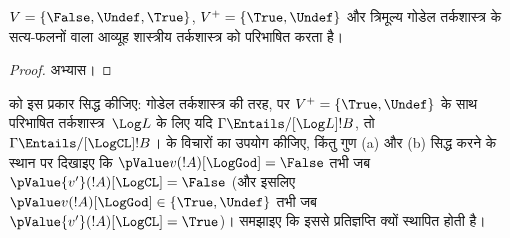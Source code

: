 \documentclass[../../../include/open-logic-section]{subfiles}
\begin{document}
\begin{prop}
  $V = \{\False, \Undef,\True\}$, $V^+=\{\True, \Undef\}$ और त्रिमूल्य
  गोडेल तर्कशास्त्र के सत्य-फलनों वाला आव्यूह शास्त्रीय तर्कशास्त्र को
  परिभाषित करता है।
\end{prop}

\begin{proof}
  अभ्यास।
\end{proof}

\begin{prob}
   को इस प्रकार सिद्ध कीजिए: गोडेल
  तर्कशास्त्र की तरह, पर $V^+=\{\True,\Undef\}$ के साथ परिभाषित
  तर्कशास्त्र~$\Log L$ के लिए यदि $\Gamma \Entails/[\Log L] !B$, तो
  $\Gamma \Entails/[\LogCL] !B$।
   के विचारों का उपयोग कीजिए, किंतु
  गुण (a) और (b) सिद्ध करने के स्थान पर दिखाइए कि
  $\pValue v(!A)[\LogGod] = \False$ तभी जब
  $\pValue {v'}(!A)[\LogCL] = \False$ (और इसलिए
  $\pValue v(!A)[\LogGod] \in \{\True,\Undef\}$ तभी जब
  $\pValue {v'}(!A)[\LogCL] = \True$)। समझाइए कि इससे प्रतिज्ञप्ति क्यों
  स्थापित होती है।
\end{prob}
\end{document}
